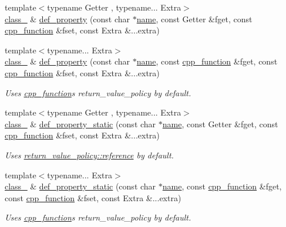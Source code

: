 \begin{DoxyCompactItemize}
{\footnotesize template$<$typename Getter , typename... Extra$>$ }\\\mbox{\hyperlink{classclass__}{class\+\_\+}} \& \mbox{\hyperlink{classclass___a14c7125697800c6b8987c1c5f15aaea9}{def\+\_\+property}} (const char $\ast$\mbox{\hyperlink{structname}{name}}, const Getter \&fget, const \mbox{\hyperlink{classcpp__function}{cpp\+\_\+function}} \&fset, const Extra \&...extra)
\item 
{\footnotesize template$<$typename... Extra$>$ }\\\mbox{\hyperlink{classclass__}{class\+\_\+}} \& \mbox{\hyperlink{classclass___ab976d0a595ac11629949c1faa8b2e09d}{def\+\_\+property}} (const char $\ast$\mbox{\hyperlink{structname}{name}}, const \mbox{\hyperlink{classcpp__function}{cpp\+\_\+function}} \&fget, const \mbox{\hyperlink{classcpp__function}{cpp\+\_\+function}} \&fset, const Extra \&...extra)
\begin{DoxyCompactList}\small\item\em Uses \mbox{\hyperlink{classcpp__function}{cpp\+\_\+function}}\textquotesingle{}s return\+\_\+value\+\_\+policy by default. \end{DoxyCompactList}\item 
{\footnotesize template$<$typename Getter , typename... Extra$>$ }\\\mbox{\hyperlink{classclass__}{class\+\_\+}} \& \mbox{\hyperlink{classclass___ab78c60e008d354283f76eef3b7c6e221}{def\+\_\+property\+\_\+static}} (const char $\ast$\mbox{\hyperlink{structname}{name}}, const Getter \&fget, const \mbox{\hyperlink{classcpp__function}{cpp\+\_\+function}} \&fset, const Extra \&...extra)
\begin{DoxyCompactList}\small\item\em Uses \mbox{\hyperlink{detail_2common_8h_adde72ab1fb0dd4b48a5232c349a53841ab8af13ea9c8fe890c9979a1fa8dbde22}{return\+\_\+value\+\_\+policy\+::reference}} by default. \end{DoxyCompactList}\item 
{\footnotesize template$<$typename... Extra$>$ }\\\mbox{\hyperlink{classclass__}{class\+\_\+}} \& \mbox{\hyperlink{classclass___a1c2c3cfa3f7ba78fcb344a716dcc59a3}{def\+\_\+property\+\_\+static}} (const char $\ast$\mbox{\hyperlink{structname}{name}}, const \mbox{\hyperlink{classcpp__function}{cpp\+\_\+function}} \&fget, const \mbox{\hyperlink{classcpp__function}{cpp\+\_\+function}} \&fset, const Extra \&...extra)
\begin{DoxyCompactList}\small\item\em Uses \mbox{\hyperlink{classcpp__function}{cpp\+\_\+function}}\textquotesingle{}s return\+\_\+value\+\_\+policy by default. \end{DoxyCompactList}\end{DoxyCompactItemize}
